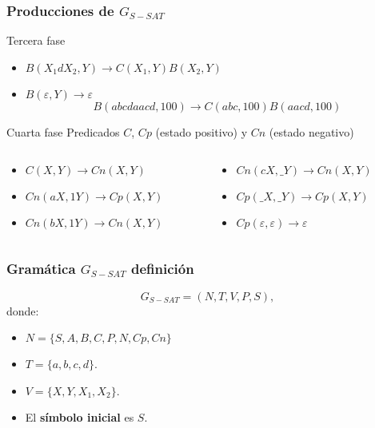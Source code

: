 \documentclass{beamer}
\begin{document}
\begin{frame}
    \frametitle{Producciones de $G_{S-SAT}$}
    
    \begin{block}{Tercera fase}
        \begin{itemize}
            \item $B(X_1dX_2,Y)\to C(X_1,Y) B(X_2,Y)$
                  \pause
            \item $B(\varepsilon,Y)\to\varepsilon$
                  \pause
                  $$B(abcdaacd,100)\to C(abc,100) B(aacd,100)$$
        \end{itemize}
        
    \end{block}
    \pause
    \begin{block}{Cuarta fase}
        Predicados $C$, $Cp$ (estado positivo) y $Cn$ (estado negativo)\\
        \begin{columns}
            \begin{column}{0.45\textwidth}
                \begin{itemize}
                    \item $C(X,Y)\to Cn(X,Y)$
                          \pause
                    \item $Cn(aX,1Y)\to Cp(X,Y)$
                          \pause
                    \item $Cn(bX,1Y)\to Cn(X,Y)$
                \end{itemize}
            \end{column}
            \pause
            \begin{column}{0.45\textwidth}
                \begin{itemize}
                    \item $Cn(cX,\_Y)\to Cn(X,Y)$
                          \pause
                    \item $Cp(\_X,\_Y)\to Cp(X,Y)$
                          \pause
                    \item $Cp(\varepsilon,\varepsilon)\to \varepsilon$
                \end{itemize}
            \end{column}
        \end{columns}
        
    \end{block}
\end{frame}


\begin{frame}
    \frametitle{Gramática $G_{S-SAT}$ definición}
    
    \[
        G_{S-SAT} = (N, T, V, P, S),
    \]
    donde:
    
    \begin{itemize}
        \item $N=\{S,A,B,C,P,N,Cp,Cn\}$
        \item $T=\{a,b,c,d\}$.
        \item $V=\{X,Y,X_1,X_2\}$.
        \item El \textbf{símbolo inicial} es $S$.
    \end{itemize}
\end{frame}
\end{document}

